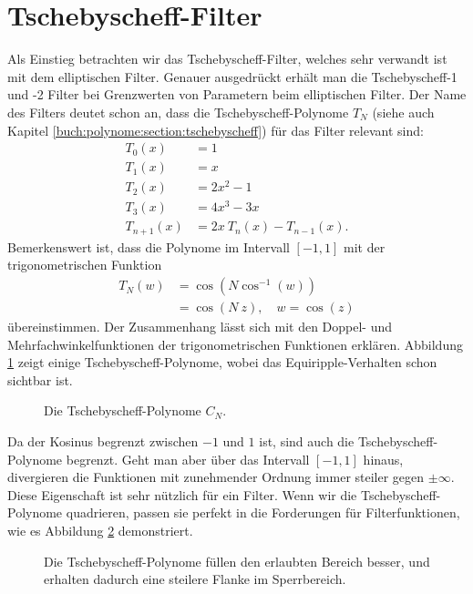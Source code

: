 \section{Tschebyscheff-Filter}

Als Einstieg betrachten wir das Tschebyscheff-Filter, welches sehr verwandt ist mit dem elliptischen Filter.
Genauer ausgedrückt erhält man die Tschebyscheff-1 und -2 Filter bei Grenzwerten von Parametern beim elliptischen Filter.
Der Name des Filters deutet schon an, dass die Tschebyscheff-Polynome $T_N$ (siehe auch Kapitel \ref{buch:polynome:section:tschebyscheff}) für das Filter relevant sind:
\begin{align*}
    T_{0}(x)&=1\\
    T_{1}(x)&=x\\
    T_{2}(x)&=2x^{2}-1\\
    T_{3}(x)&=4x^{3}-3x\\
    T_{n+1}(x)&=2x~T_{n}(x)-T_{n-1}(x).
\end{align*}
Bemerkenswert ist, dass die Polynome im Intervall $[-1, 1]$ mit der trigonometrischen Funktion
\begin{align} \label{ellfilter:eq:chebychef_polynomials}
    T_N(w) &= \cos \left( N \cos^{-1}(w) \right) \\
           &= \cos \left(N~z \right), \quad w= \cos(z) \label{ellfilter:eq:chebychef_polynomials2}
\end{align}
übereinstimmen.
Der Zusammenhang lässt sich mit den Doppel- und Mehrfachwinkelfunktionen der trigonometrischen Funktionen erklären.
Abbildung \ref{ellfilter:fig:chebychef_polynomials} zeigt einige Tschebyscheff-Polynome, wobei das Equiripple-Verhalten schon sichtbar ist.
\begin{figure}
    \centering
    
    \caption{Die Tschebyscheff-Polynome $C_N$.}
    \label{ellfilter:fig:chebychef_polynomials}
\end{figure}
Da der Kosinus begrenzt zwischen $-1$ und $1$ ist, sind auch die Tschebyscheff-Polynome begrenzt.
Geht man aber über das Intervall $[-1, 1]$ hinaus, divergieren die Funktionen mit zunehmender Ordnung immer steiler gegen $\pm \infty$.
Diese Eigenschaft ist sehr nützlich für ein Filter.
Wenn wir die Tschebyscheff-Polynome quadrieren, passen sie perfekt in die Forderungen für Filterfunktionen, wie es Abbildung \ref{ellfiter:fig:chebychef} demonstriert.
\begin{figure}
    \centering
    
    \caption{Die Tschebyscheff-Polynome füllen den erlaubten Bereich besser, und erhalten dadurch eine steilere Flanke im Sperrbereich.}
    \label{ellfiter:fig:chebychef}
\end{figure}

